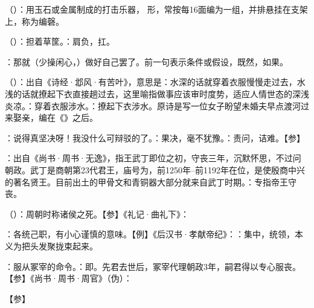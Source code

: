 {
\item {}（）：用玉石或金属制成的打击乐器， 形，常按每16面编为一组，并排悬挂在支架上，称为编磬。
\item {}（）：担着草筐。：肩负，扛。
\item {}：那就（少操闲心，）做好自己罢了。前一句表示条件或假设，既然，如果。
\item {}（）：出自《诗经·邶风·有苦叶》，意思是：水深的话就穿着衣服慢慢走过去，水浅的话就撩起下衣直接趟过去，这里喻指做事应该审时度势，适应人情世态的深浅炎凉。：穿着衣服涉水。：撩起下衣涉水。原诗是写一位女子盼望未婚夫早点渡河过来娶亲，编在《》之后。
\item {}：说得真坚决呀！我没什么可辩驳的了。：果决，毫不犹豫。：责问，诘难。【参】
}
{}  %


{
\item {}：出自《尚书·周书·无逸》，指王武丁即位之初，守丧三年，沉默怀思，不过问朝政。武丁是商朝第23代君王，庙号为，前1250年--前1192年在位，是使殷商中兴的著名贤王。目前出土的甲骨文和青铜器大部分就来自武丁时期。：专指帝王守丧。
\item {}（）：周朝时称诸侯之死。【参】《礼记·曲礼下》：
\item {}：各统己职，有小心谨慎的意味。【例】《后汉书·孝献帝纪》：：集中，统领，本义为把头发聚拢束起来。
\item {}：服从冢宰的命令。：即。先君去世后，冢宰代理朝政3年，嗣君得以专心服丧。【参】《尚书·周书·周官》（伪）：
}
{}


{【参】}
{}


